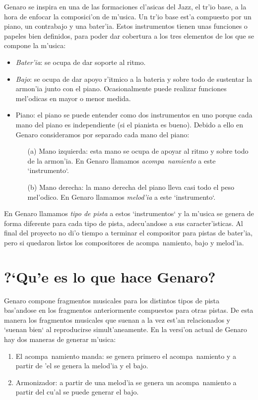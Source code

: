 \documentclass[a4paper,12pt]{article}
\begin{document}
Genaro se inspira en una de las formaciones cl'asicas del Jazz, el tr'io base, a la hora de enfocar la composici'on de m'usica. Un tr'io base est'a compuesto por un piano, un contrabajo y una bater'ia. Estos instrumentos tienen unas funciones o papeles bien definidos, para poder dar cobertura a los tres elementos de los que se compone la m'usica:
\begin{itemize}
\item \emph{Bater'ia}: se ocupa de dar soporte al ritmo.
\item \emph{Bajo}: se ocupa de dar apoyo r'itmico a la bateria y sobre todo de sustentar la armon'ia junto con el piano. Ocasionalmente puede realizar funciones mel'odicas en mayor o menor medida.
\item Piano: el piano se puede entender como dos instrumentos en uno porque cada mano del piano es independiente (si el pianista es bueno). Debido a ello en Genaro consideramos por separado cada mano del piano:
        \begin{enumerate}
        \item[(a)] Mano izquierda: esta mano se ocupa de apoyar al ritmo y sobre todo de la armon'ia. En Genaro llamamos \emph{acompa~namiento} a este `instrumento`.
        \item[(b)] Mano derecha: la mano derecha del piano lleva casi todo el peso mel'odico. En Genaro llamamos \emph{melod'ia} a este `instrumento`.
        \end{enumerate}
\end{itemize}

En Genaro llamamos \emph{tipo de pista} a estos `instrumentos` y la m'usica se genera de forma diferente para cada tipo de pista, adecu'andose a sus caracter'isticas. Al final del proyecto no di'o tiempo a terminar el compositor para pistas de bater'ia, pero si quedaron listos los compositores de acompa~namiento, bajo y melod'ia.

\section{?`Qu'e es lo que hace Genaro?}
Genaro compone fragmentos musicales para los distintos tipos de pista bas'andose en los fragmentos anteriormente compuestos para otras pistas. De esta manera los fragmentos musicales que suenan a la vez est'an relacionados y `suenan bien` al reproducirse simult'aneamente. En la versi'on actual de Genaro hay dos maneras de generar m'usica:
\begin{enumerate}
\item El acompa~namiento manda: se genera primero el acompa~namiento y a partir de 'el se genera la melod'ia y el bajo.
\item Armonizador: a partir de una melod'ia se genera un acompa~namiento a partir del cu'al se puede generar el bajo.
\end{enumerate}
\end{document}
